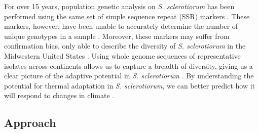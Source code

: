 \documentclass[12pt,letterpaper]{article}
\begin{document}
For over 15 years, population genetic analysis on \textit{S. sclerotiorum} has been performed using the same set of simple sequence repeat (SSR) markers \citep{sirjusingh2001characterization}. 
These markers, however, have been unable to accurately determine the number of unique genotypes in a sample \citep{lehner2017independently, lehner2017sclerotinia,arnaud2007standardizing}.
Moreover, these markers may suffer from confirmation bias, only able to describe the diversity of \textit{S. sclerotiorum} in the Midwestern United States \citep{attanayake2013sclerotinia}. 
Using whole genome sequences of representative isolates across continents allows us to capture a breadth of diversity, giving us a clear picture of the adaptive potential in \textit{S. sclerotiorum} \citep{grunwald2016population}.
By understanding the potential for thermal adaptation in \textit{S. sclerotiorum}, we can better predict how it will respond to changes in climate \citep{croll2016genetic}.


\subsection{Approach}



 
 
 
 
\end{document}
